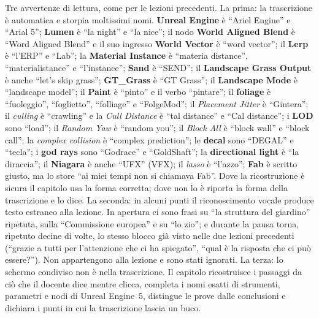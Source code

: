 Tre avvertenze di lettura, come per le lezioni precedenti. La prima: la trascrizione è
automatica e storpia moltissimi nomi. \textbf{Unreal Engine} è ``Ariel Engine'' e ``Arial
5''; \textbf{Lumen} è ``la night'' e ``la nice''; il nodo \textbf{World Aligned Blend} è
``Word Aligned Blend'' e il suo ingresso \textbf{World Vector} è ``word vector''; il
\textbf{Lerp} è ``l'ERP'' e ``Lab''; la \textbf{Material Instance} è ``materia distance'',
``materialistance'' e ``l'instance''; \textbf{Sand} è ``SEND''; il \textbf{Landscape Grass
Output} è anche ``let's skip grass''; \textbf{GT\_Grass} è ``GT Grass''; il \textbf{Landscape
Mode} è ``landscape model''; il \textbf{Paint} è ``pinto'' e il verbo ``pintare''; il
\textbf{foliage} è ``fuoleggio'', ``foglietto'', ``folliage'' e ``FolgeMod''; il
\emph{Placement Jitter} è ``Gintera''; il \emph{culling} è ``crawling'' e la \emph{Cull
Distance} è ``tal distance'' e ``Cal distance''; i \textbf{LOD} sono ``load''; il
\emph{Random Yaw} è ``random you''; il \emph{Block All} è ``block wall'' e ``block call'';
la \emph{complex collision} è ``complex prediction''; le \textbf{decal} sono ``DEGAL'' e
``tecla''; i \textbf{god rays} sono ``Godrace'' e ``GoldShaft''; la \textbf{directional
light} è ``la diraccia''; il \textbf{Niagara} è anche ``UFX'' (VFX); il \emph{lasso} è
``l'azzo''; \textbf{Fab} è scritto giusto, ma lo store ``ai miei tempi non si chiamava
Fab''. Dove la ricostruzione è sicura il capitolo usa la forma corretta; dove non lo è
riporta la forma della trascrizione e lo dice. La seconda: in alcuni punti il
riconoscimento vocale produce testo estraneo alla lezione. In apertura ci sono frasi su
``la struttura del giardino'' ripetuta, sulla ``Commissione europea'' e su ``lo zio''; e
durante la pausa torna, ripetuto decine di volte, lo stesso blocco già visto nelle due
lezioni precedenti (``grazie a tutti per l'attenzione che ci ha spiegato'', ``qual è la
risposta che ci può essere?''). Non appartengono alla lezione e sono stati ignorati. La
terza: lo schermo condiviso non è nella trascrizione. Il capitolo ricostruisce i passaggi
da ciò che il docente dice mentre clicca, completa i nomi esatti di strumenti, parametri e
nodi di Unreal Engine~5, distingue le prove dalle conclusioni e dichiara i punti in cui la
trascrizione lascia un buco.

